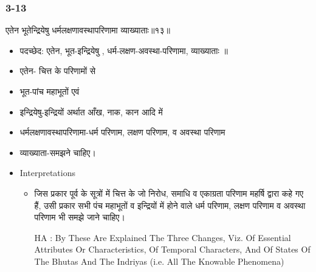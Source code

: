 \begin{frame}[fragile]\frametitle{3-13}
\begin{sanskrit}
एतेन भूतेन्द्रियेषु धर्मलक्षणावस्थापरिणामा व्याख्याताः॥१३॥
\end{sanskrit}

	\begin{itemize}
	\item पदच्छेद: एतेन, भूत-इन्द्रियेषु , धर्म-लक्षण-अवस्था-परिणामा, व्याख्याताः ॥
	\item एतेन- चित्त के परिणामों से
	\item भूत-पांच महाभूतों एवं
	\item इन्द्रियेषु-इन्द्रियों अर्थात आँख, नाक, कान आदि में
	\item धर्मलक्षणावस्थापरिणामा-धर्म परिणाम, लक्षण परिणाम, व अवस्था परिणाम
	\item व्याख्याता-समझने चाहिए।	
	\item Interpretations
		\begin{itemize}	
		\item जिस प्रकार पूर्व के सूत्रों में चित्त के जो निरोध, समाधि व एकाग्रता परिणाम महर्षि द्वारा कहे गए हैं, उसी प्रकार सभी पंच महाभूतों व इन्द्रियों में होने वाले धर्म परिणाम, लक्षण परिणाम व अवस्था परिणाम भी समझे जाने चाहिए।
		\item [HA]: By These Are Explained The Three Changes, Viz. Of Essential Attributes Or Characteristics, Of Temporal Characters, And Of States Of The Bhutas And The Indriyas (i.e. All The Knowable Phenomena)
		\end{itemize}
	\end{itemize}
\end{frame}


